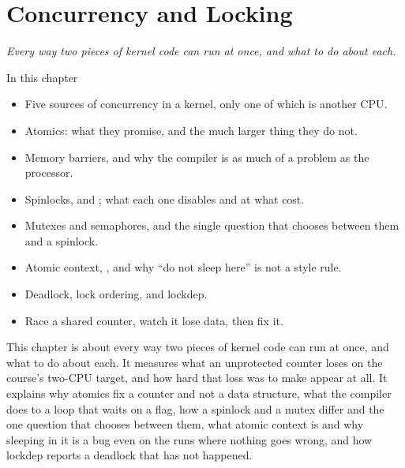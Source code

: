 
\chapter{Concurrency and Locking}
\label{c7:ch}

{\large\itshape Every way two pieces of kernel code can run at once, and what to do about each.\par}

\begin{chapterbox}{In this chapter}
\begin{itemize}
  \item Five sources of concurrency in a kernel, only one of which is another CPU.
  \item Atomics: what they promise, and the much larger thing they do not.
  \item Memory barriers, and why the compiler is as much of a problem as the processor.
  \item Spinlocks,  and ; what each one disables and at what cost.
  \item Mutexes and semaphores, and the single question that chooses between them and a spinlock.
  \item Atomic context, , and why ``do not sleep here'' is not a style rule.
  \item Deadlock, lock ordering, and lockdep.
  \item Race a shared counter, watch it lose data, then fix it.
\end{itemize}
\end{chapterbox}

This chapter is about every way two pieces of kernel code can run at once, and what to do about
each. It measures what an unprotected counter loses on the course's two-CPU target, and how hard
that loss was to make appear at all. It explains why atomics fix a counter and not a data
structure, what the compiler does to a loop that waits on a flag, how a spinlock and a mutex differ
and the one question that chooses between them, what atomic context is and why sleeping in it is a
bug even on the runs where nothing goes wrong, and how lockdep reports a deadlock that has not
happened.

